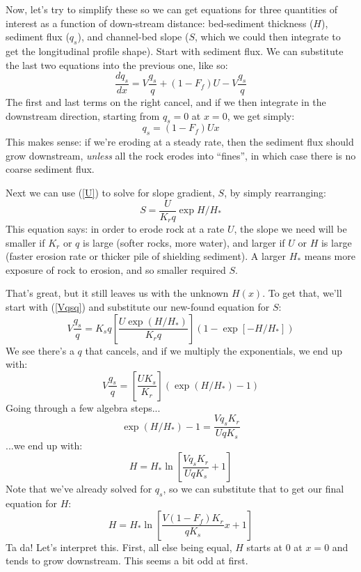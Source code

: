 \documentclass[12pt]{amsart}
\begin{document}
Now, let's try to simplify these so we can get equations for three quantities of interest as a function of down-stream distance: bed-sediment thickness ($H$), sediment flux ($q_s$), and channel-bed slope ($S$, which we could then integrate to get the longitudinal profile shape). Start with sediment flux. We can substitute the last two equations into the previous one, like so:
\begin{equation}
\frac{dq_s}{dx} = V\frac{q_s}{q} + (1-F_f) U - V\frac{q_s}{q}
\end{equation}
The first and last terms on the right cancel, and if we then integrate in the downstream direction, starting from $q_s=0$ at $x=0$, we get simply:
\begin{equation}
q_s = (1 - F_f) U x
\end{equation}
This makes sense: if we're eroding at a steady rate, then the sediment flux should grow downstream, {\em unless} all the rock erodes into ``fines'', in which case there is no coarse sediment flux.

Next we can use (\ref{U}) to solve for slope gradient, $S$, by simply rearranging:
\begin{equation}
S = \frac{U}{K_r q} \exp{H/H_*}
\end{equation}
This equation says: in order to erode rock at a rate $U$, the slope we need will be smaller if $K_r$ or $q$ is large (softer rocks, more water), and larger if $U$ or $H$ is large (faster erosion rate or thicker pile of shielding sediment). A larger $H_*$ means more exposure of rock to erosion, and so smaller required $S$.

That's great, but it still leaves us with the unknown $H(x)$. To get that, we'll start with (\ref{Vqsq}) and substitute our new-found equation for $S$:
\begin{equation*}
V\frac{q_s}{q} = K_s q \left[ \frac{U \exp (H/H_*)}{K_r q} \right] ( 1 - \exp [-H/H_*] )
\end{equation*}
We see there's a $q$ that cancels, and if we multiply the exponentials, we end up with:
\begin{equation*}
V\frac{q_s}{q} = \left[ \frac{U K_s}{K_r} \right] ( \exp (H/H_*) - 1 )
\end{equation*}
Going through a few algebra steps...
\begin{equation*}
\exp (H/H_*) - 1 = \frac{V q_s K_r}{U q K_s}
\end{equation*}
...we end up with:
\begin{equation*}
H = H_* \ln \left[ \frac{V q_s K_r}{U q K_s} + 1 \right]
\end{equation*}
Note that we've already solved for $q_s$, so we can substitute that to get our final equation for $H$:
\begin{equation}
H = H_* \ln \left[ \frac{V (1 - F_f) K_r}{q K_s} x + 1 \right]
\end{equation}
Ta da! Let's interpret this. First, all else being equal, $H$ starts at 0 at $x=0$ and tends to grow downstream. This seems a bit odd at first.
\end{document}

